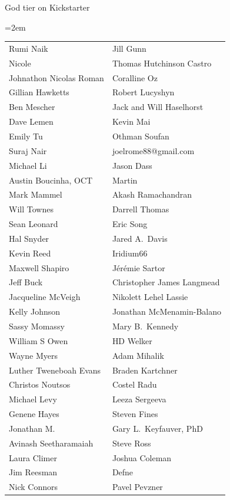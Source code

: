 God tier on Kickstarter
\begin{center}
\tabcolsep=2em
\begin{tabular}{l l}
Rumi Naik & Jill Gunn\\
Nicole & Thomas Hutchinson Castro\\
Johnathon Nicolas Roman & Coralline Oz\\
Gillian Hawketts & Robert Lucyshyn\\
Ben Mescher & Jack and Will Haselhorst\\
Dave Lemen & Kevin Mai\\
Emily Tu & Othman Soufan\\
Suraj Nair & joelrome88@gmail.com\\
Michael Li & Jason Dass\\
Austin Boucinha, OCT & Martin\\
Mark Mammel & Akash Ramachandran\\
Will Townes & Darrell Thomas\\
Sean Leonard & Eric Song\\
Hal Snyder & Jared A.~Davis\\
Kevin Reed & Iridium66\\
Maxwell Shapiro & Jérémie Sartor\\
Jeff Buck & Christopher James Langmead\\
Jacqueline McVeigh & Nikolett Lehel Lassie\\
Kelly Johnson & Jonathan McMenamin-Balano\\
Sassy Momassy & Mary B.~Kennedy\\
William S Owen & HD Welker\\
Wayne Myers & Adam Mihalik\\
Luther Tweneboah Evans & Braden Kartchner\\
Christos Noutsos & Costel Radu\\
Michael Levy & Leeza Sergeeva\\
Genene Hayes & Steven Fines\\
Jonathan M. & Gary L.~Keyfauver, PhD\\
Avinash Seetharamaiah & Steve Ross\\
Laura Climer & Joshua Coleman\\
Jim Reesman & Defne\\
Nick Connors & Pavel Pevzner\\
\end{tabular}
\end{center}

